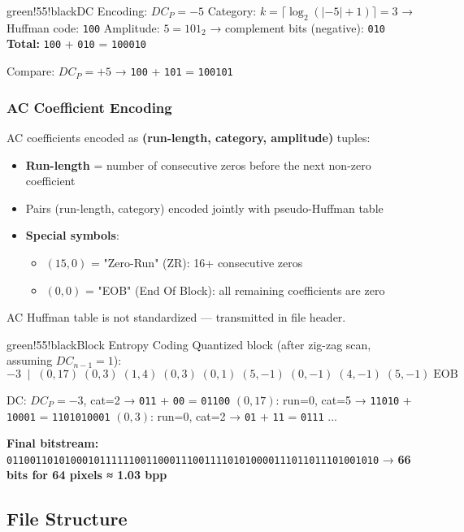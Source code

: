 \begin{calloutbox}{green!55!black}{DC Encoding: $DC_P = -5$}
Category: $k = \lceil\log_2(|-5|+1)\rceil = 3$ → Huffman code: \texttt{100} Amplitude: $5 = 101_2$ → complement bits (negative): \texttt{010} \textbf{Total:} \texttt{100} + \texttt{010} = \texttt{100010}

Compare: $DC_P = +5$ → \texttt{100} + \texttt{101} = \texttt{100101}
\end{calloutbox}

\subsubsection{AC Coefficient Encoding}

AC coefficients encoded as \textbf{(run-length, category, amplitude)} tuples:
\begin{itemize}
\item \textbf{Run-length} = number of consecutive zeros before the next non-zero coefficient
\item Pairs (run-length, category) encoded jointly with pseudo-Huffman table
\item \textbf{Special symbols}:
\begin{itemize}
\item $(15, 0)$ = "Zero-Run" (ZR): 16+ consecutive zeros
\item $(0, 0)$ = "EOB" (End Of Block): all remaining coefficients are zero
\end{itemize}
\end{itemize}

AC Huffman table is not standardized — transmitted in file header.

\begin{calloutbox}{green!55!black}{Block Entropy Coding}
Quantized block (after zig-zag scan, assuming $DC_{n-1}=1$):
\[
-3 \;\mid\; (0,17)\; (0,3)\; (1,4)\; (0,3)\; (0,1)\; (5,-1)\; (0,-1)\; (4,-1)\; (5,-1)\; \text{EOB}
\]

DC: $DC_P=-3$, cat=2 → \texttt{011} + \texttt{00} = \texttt{01100} $(0,17)$: run=0, cat=5 → \texttt{11010} + \texttt{10001} = \texttt{1101010001} $(0,3)$: run=0, cat=2 → \texttt{01} + \texttt{11} = \texttt{0111} ...

\textbf{Final bitstream:} \texttt{0110011010100010111111001100011100111101010000111011011101001010} → \textbf{66 bits for 64 pixels ≈ 1.03 bpp}
\end{calloutbox}

\subsection{File Structure}

